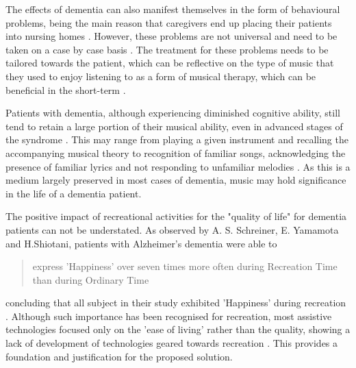 The effects of dementia can also manifest themselves in the form of behavioural problems, being the main reason that caregivers end up placing their patients into nursing homes \citep{stoppe1999behavioural}. However, these problems are not universal and need to be taken on a case by case basis \citep{10.1001/jama.1982.03330030039022}. The treatment for these problems needs to be tailored towards the patient, which can be reflective on the type of music that they used to enjoy listening to as a form of musical therapy, which can be beneficial in the short-term \citep{mcdermott2013music}.

Patients with dementia, although experiencing diminished cognitive ability, still tend to retain a large portion of their musical ability, even in advanced stages of the syndrome \citep{BAIRD2015207}. This may range from playing a given instrument and recalling the accompanying musical theory \citep{beatty1988preserved} to recognition of familiar songs, acknowledging the presence of familiar lyrics and not responding to unfamiliar melodies \citep{cuddy2005music}. As this is a medium largely preserved in most cases of dementia, music may hold significance in the life of a dementia patient.

The positive impact of recreational activities for the "quality of life" for dementia patients can not be understated. As observed by A. S. Schreiner, E. Yamamota and H.Shiotani, patients with Alzheimer's dementia were able to \begin{quotation} express 'Happiness' over seven times more often during Recreation Time than during Ordinary Time
\end{quotation} concluding that all subject in their study exhibited 'Happiness' during recreation \citep{Schreiner01032005}. Although such importance has been recognised for recreation, most assistive technologies focused only on the 'ease of living' rather than the quality, showing a lack of development of technologies geared towards recreation \citep{10.1007/978-3-319-20916-6_38}. This provides a foundation and justification for the proposed solution. 

